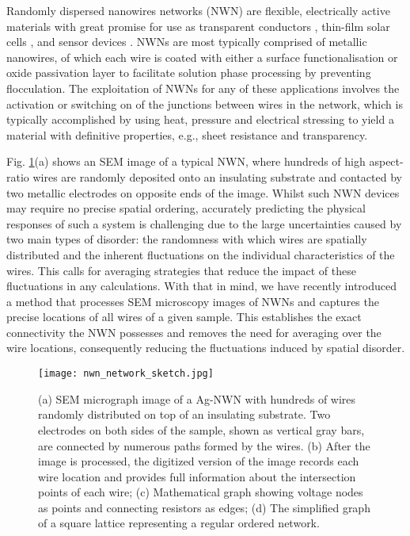 Randomly dispersed nanowires networks (NWN) are flexible, electrically active materials with great promise for use as transparent conductors \cite{liang2014,bergin2012,langley2013}, thin-film solar cells \cite{song2013,dechan2015,kim2013}, and sensor devices \cite{choi2008,datta2014}.  NWNs are most typically comprised of metallic nanowires, of which each wire is coated with either a surface functionalisation or oxide passivation layer to facilitate solution phase processing by preventing flocculation. The exploitation of NWNs for any of these applications involves the activation or switching on of the junctions between wires in the network, which is typically accomplished by using heat\cite{madaria2010,hwang2014}, pressure\cite{liangbing2010} and electrical stressing\cite{nirmalraj2012} to yield a material with definitive properties, e.g., sheet resistance and transparency.

Fig. \ref{fig:image}(a) shows an SEM image of a typical NWN, where hundreds of high aspect-ratio wires are randomly deposited onto an insulating substrate and contacted by two metallic electrodes on opposite ends of the image. Whilst such NWN devices may require no precise spatial ordering, accurately predicting the physical responses of such a system is challenging due to the large uncertainties caused by two main types of disorder: the randomness with which wires are spatially distributed and the inherent fluctuations on the individual characteristics of the wires. This calls for averaging strategies that reduce the impact of these fluctuations in any calculations. With that in mind, we have recently introduced a method that processes SEM microscopy images of NWNs and captures the precise locations of all wires of a given sample\cite{rocha2015}. This establishes the exact connectivity the NWN possesses and removes the need for averaging over the wire locations, consequently reducing the fluctuations induced by spatial disorder. 
 \begin{figure}[h!]
\centering
\texttt{[image: nwn\_network\_sketch.jpg]}
\caption{(a) SEM micrograph image of a Ag-NWN with hundreds of wires randomly distributed on top of an insulating substrate. Two electrodes on both sides of the sample, shown as vertical gray bars, are connected by numerous paths formed by the wires. (b) After the image is processed, the digitized version of the image records each wire location and provides full information about the intersection points of each wire; (c) Mathematical graph showing voltage nodes as points and connecting resistors as edges; (d)  
The simplified graph of a square lattice representing a regular ordered network. }
\label{fig:image}
\end{figure}

